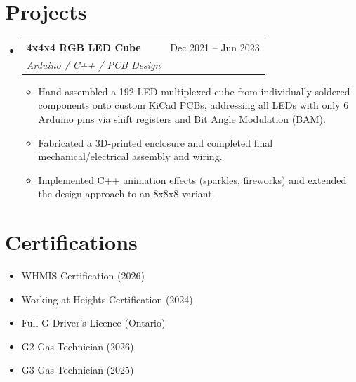 \documentclass[letterpaper,11pt]{article}
\makeatletter
\newcommand{\resumeItem}[1]{\item\small{{#1 \vspace{-2pt}}}}
\newcommand{\resumeSubheading}[4]{
  \vspace{-4pt}\item
    \begin{tabular*}{0.97\textwidth}[t]{l@{\extracolsep{\fill}}r}
      \textbf{#1} & #2 \\
      \textit{\small #3} & \textit{\small #4} \\
    \end{tabular*}\vspace{-8pt}
}
\newcommand{\resumeSubHeadingListStart}{\begin{itemize}[leftmargin=0.15in, label={}]}
\newcommand{\resumeSubHeadingListEnd}{\end{itemize}}
\newcommand{\resumeItemListStart}{\begin{itemize}}
\newcommand{\resumeItemListEnd}{\end{itemize}\vspace{-5pt}}
\makeatother
\begin{document}
\section{Projects}
\resumeSubHeadingListStart
\resumeSubheading
  {4x4x4 RGB LED Cube}{Dec 2021 -- Jun 2023}
  {Arduino / C++ / PCB Design}{ }
\resumeItemListStart
  \resumeItem{Hand-assembled a 192-LED multiplexed cube from individually soldered components onto custom KiCad PCBs, addressing all LEDs with only 6 Arduino pins via shift registers and Bit Angle Modulation (BAM).}
  \resumeItem{Fabricated a 3D-printed enclosure and completed final mechanical/electrical assembly and wiring.}
  \resumeItem{Implemented C++ animation effects (sparkles, fireworks) and extended the design approach to an 8x8x8 variant.}
\resumeItemListEnd
\resumeSubHeadingListEnd

\section{Certifications}
\begin{itemize}[leftmargin=0.15in]
  \item WHMIS Certification (2026)
  \item Working at Heights Certification (2024)
  \item Full G Driver's Licence (Ontario)
  \item G2 Gas Technician (2026)
  \item G3 Gas Technician (2025)
\end{itemize}
\end{document}
